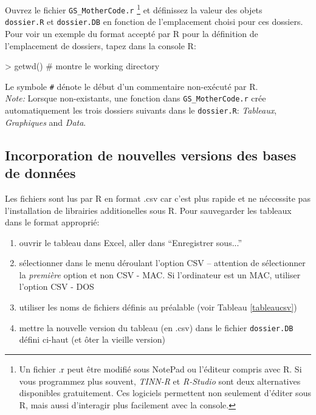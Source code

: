 \documentclass{article}
\begin{document}
Ouvrez le fichier \texttt{GS\_MotherCode.r} \footnote{Un fichier .r
  peut être modifié sous NotePad ou l'éditeur
compris avec R. Si vous programmez plus souvent, \emph{TINN-R} et \emph{R-Studio}
sont deux alternatives disponibles gratuitement. Ces logiciels
permettent non seulement
d'éditer sous R, mais aussi d'interagir plus facilement avec la
console. } et définissez la valeur des objets \\ \texttt{dossier.R} et \texttt{dossier.DB}
en fonction de l'emplacement choisi pour ces dossiers.
Pour voir un exemple du format accepté par R pour la
  définition de l'emplacement de dossiers, tapez dans la console R:
\begin{Schunk}
\begin{Sinput}
> getwd() # montre le working directory
\end{Sinput}
\end{Schunk}
  \noindent Le symbole \texttt{\#} dénote le début d'un commentaire non-exécuté
par R.\\

\noindent \emph{Note:} Lorsque non-existants, une fonction dans \texttt{GS\_MotherCode.r} crée
automatiquement les trois dossiers
suivants dans le \texttt{dossier.R}: \emph{Tableaux},
\emph{Graphiques} and \emph{Data}. \\

\subsection{Incorporation de nouvelles versions des bases de données}
\label{nouvdb}
Les fichiers sont lus par R en format .csv car c'est plus rapide et
ne néccessite pas l'installation de librairies additionelles sous
R. Pour sauvegarder les tableaux dans le format approprié:

\begin{enumerate}
  \item ouvrir le tableau dans Excel, aller dans ``Enregistrer sous...''
  \item sélectionner dans le menu déroulant l'option CSV -- attention
    de sélectionner la \emph{première} option et non CSV - MAC. Si
    l'ordinateur est un MAC, utiliser l'option CSV - DOS
  \item utiliser les noms de fichiers définis au préalable (voir
    Tableau \ref{tableaucsv})
   \item mettre la nouvelle version du tableau (en .csv) dans le
    fichier \texttt{dossier.DB} défini ci-haut (et ôter la vieille
    version)
  \end{enumerate}
\end{document}
